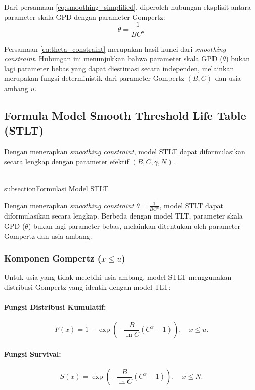 Dari persamaan \eqref{eq:smoothing_simplified}, diperoleh hubungan eksplisit antara parameter skala GPD dengan parameter Gompertz:
\begin{equation}
\boxed{\theta = \frac{1}{BC^u}}
\label{eq:theta_constraint}
\end{equation}

Persamaan \eqref{eq:theta_constraint} merupakan hasil kunci dari \textit{smoothing constraint}. Hubungan ini menunjukkan bahwa parameter skala GPD ($\theta$) bukan lagi parameter bebas yang dapat diestimasi secara independen, melainkan merupakan fungsi deterministik dari parameter Gompertz $(B, C)$ dan usia ambang $u$.

\subsection{Formula Model Smooth Threshold Life Table (STLT)}

Dengan menerapkan \textit{smoothing constraint}, model STLT dapat diformulasikan secara lengkap dengan parameter efektif $(B, C, \gamma, N)$.

\\subsection{Formulasi Model STLT}

Dengan menerapkan \textit{smoothing constraint} $\theta = \frac{1}{BC^u}$, model STLT dapat diformulasikan secara lengkap. Berbeda dengan model TLT, parameter skala GPD ($\theta$) bukan lagi parameter bebas, melainkan ditentukan oleh parameter Gompertz dan usia ambang.

\subsubsection{Komponen Gompertz ($x \leq u$)}

Untuk usia yang tidak melebihi usia ambang, model STLT menggunakan distribusi Gompertz yang identik dengan model TLT:

\paragraph{Fungsi Distribusi Kumulatif:}
\begin{equation}
F(x) = 1 - \exp\left(-\frac{B}{\ln C}(C^x - 1)\right), \quad x \leq u.
\label{eq:stlt_gompertz_cdf}
\end{equation}

\paragraph{Fungsi Survival:}
\begin{equation}
S(x) = \exp\left(-\frac{B}{\ln C}(C^x - 1)\right), \quad x \leq N.
\label{eq:stlt_gompertz_survival}
\end{equation}

